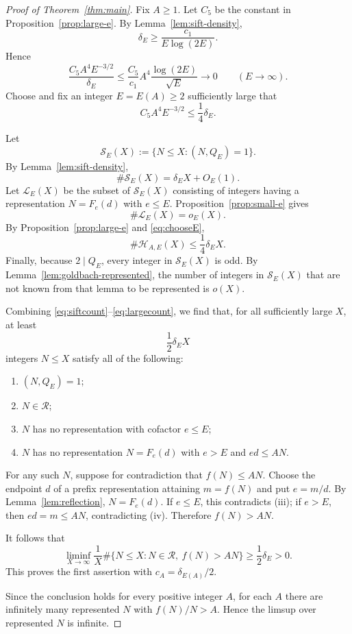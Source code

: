 \documentclass[11pt]{article}
\theoremstyle{definition}
\theoremstyle{remark}
\newcommand{\Rset}{\mathscr R}
\begin{document}
\begin{proof}[Proof of Theorem~\ref{thm:main}]
Fix $A\geq1$.  Let $C_5$ be the constant in Proposition~\ref{prop:large-e}.  By Lemma~\ref{lem:sift-density},
\[
\delta_E\geq\frac{c_1}{E\log(2E)}.
\]
Hence
\[
\frac{C_5A^4E^{-3/2}}{\delta_E}
\leq
\frac{C_5}{c_1}A^4\frac{\log(2E)}{\sqrt E}
\longrightarrow0
\qquad(E\to\infty).
\]
Choose and fix an integer $E=E(A)\geq2$ sufficiently large that
\[
C_5A^4E^{-3/2}\leq\frac14\delta_E. \tag{8.1}\label{eq:chooseE}
\]

Let
\[
\mathcal S_E(X):=\{N\leq X:(N,Q_E)=1\}.
\]
By Lemma~\ref{lem:sift-density},
\[
\#\mathcal S_E(X)=\delta_EX+O_E(1). \tag{8.2}\label{eq:siftcount}
\]
Let $\mathcal L_E(X)$ be the subset of $\mathcal S_E(X)$ consisting of integers having a representation $N=F_e(d)$ with $e\leq E$.  Proposition~\ref{prop:small-e} gives
\[
\#\mathcal L_E(X)=o_E(X). \tag{8.3}\label{eq:smallcount}
\]
By Proposition~\ref{prop:large-e} and \eqref{eq:chooseE},
\[
\#\mathcal H_{A,E}(X)\leq\frac14\delta_EX. \tag{8.4}\label{eq:largecount}
\]
Finally, because $2\mid Q_E$, every integer in $\mathcal S_E(X)$ is odd.  By Lemma~\ref{lem:goldbach-represented}, the number of integers in $\mathcal S_E(X)$ that are not known from that lemma to be represented is $o(X)$.

Combining \eqref{eq:siftcount}--\eqref{eq:largecount}, we find that, for all sufficiently large $X$, at least
\[
\frac12\delta_EX
\]
integers $N\leq X$ satisfy all of the following:
\begin{enumerate}[label=\textup{(\roman*)}]
\item $(N,Q_E)=1$;
\item $N\in\Rset$;
\item $N$ has no representation with cofactor $e\leq E$;
\item $N$ has no representation $N=F_e(d)$ with $e>E$ and $ed\leq AN$.
\end{enumerate}
For any such $N$, suppose for contradiction that $f(N)\leq AN$.  Choose the endpoint $d$ of a prefix representation attaining $m=f(N)$ and put $e=m/d$.  By Lemma~\ref{lem:reflection}, $N=F_e(d)$.  If $e\leq E$, this contradicts (iii); if $e>E$, then $ed=m\leq AN$, contradicting (iv).  Therefore $f(N)>AN$.

It follows that
\[
\liminf_{X\to\infty}\frac1X
\#\{N\leq X:N\in\Rset,\ f(N)>AN\}
\geq\frac12\delta_E>0.
\]
This proves the first assertion with $c_A=\delta_{E(A)}/2$.

Since the conclusion holds for every positive integer $A$, for each $A$ there are infinitely many represented $N$ with $f(N)/N>A$.  Hence the limsup over represented $N$ is infinite.
\end{proof}
\end{document}
